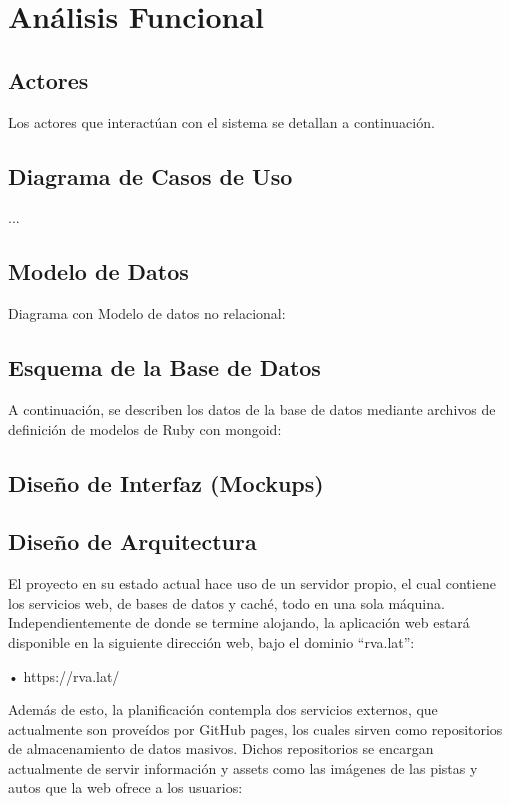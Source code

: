 \chapter{Análisis Funcional}

\section{Actores}
Los actores que interactúan con el sistema se detallan a continuación.

\section{Diagrama de Casos de Uso}
...

\section{Modelo de Datos}
Diagrama con Modelo de datos no relacional:

\section{Esquema de la Base de Datos}
A continuación, se describen los datos de la base de datos mediante archivos de definición de modelos de Ruby con mongoid:

\section{Diseño de Interfaz (Mockups)}

\section{Diseño de Arquitectura}
El proyecto en su estado actual hace uso de un servidor propio, el cual contiene los servicios web, de bases de datos y caché, todo en una sola máquina. Independientemente de donde se termine alojando, la aplicación web estará disponible en la siguiente dirección web, bajo el dominio “rva.lat”:

•	https://rva.lat/

Además de esto, la planificación contempla dos servicios externos, que actualmente son proveídos por GitHub pages, los cuales sirven como repositorios de almacenamiento de datos masivos. Dichos repositorios se encargan actualmente de servir información y assets como las imágenes de las pistas y autos que la web ofrece a los usuarios:

